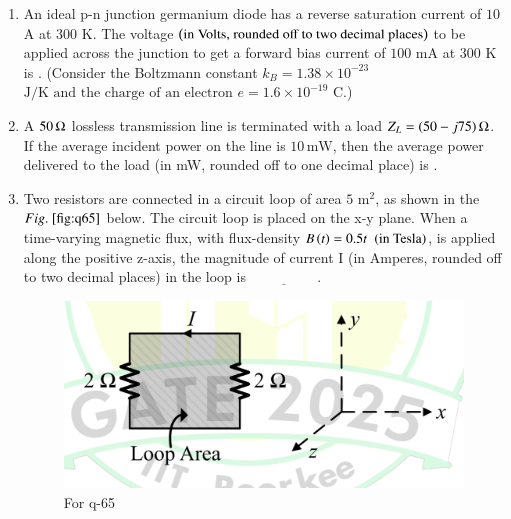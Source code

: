 \documentclass[journal,12pt,onecolumn]{IEEEtran}
\theoremstyle{remark}
\begin{document}
\begin{enumerate}
\hfill{}

\item An ideal p-n junction germanium diode has a reverse saturation current of $10$ \textmu A at $300$ K. The voltage $\left(\text{in Volts, rounded off to two decimal places}\right)$ to be applied across the junction to get a forward bias current of $100$ mA at $300$ K is \underline{\hspace{2cm}}. (Consider the Boltzmann constant $k_B = 1.38 \times 10^{-23}$$ \text{J/K and the charge of an electron } e = 1.6 \times 10^{-19} \text{ C.}$)

\hfill{}

\item A $50 \, \ohm$ lossless transmission line is terminated with a load $Z_L = (50 - j75)\,\ohm$. 
    If the average incident power on the line is $10 \,\text{mW}$, then the average power delivered to the load (in mW, rounded off to one decimal place) is \underline{\hspace{2cm}}.


\hfill{}

\item Two resistors are connected in a circuit loop of area $5$ m$^2$, as shown in the $\figref{fig:q65}$ below. The circuit loop is placed on the x-y plane. When a time-varying magnetic flux, with flux-density $B\left(t\right) = 0.5t$ $\left(\text{in Tesla}\right)$, is applied along the positive z-axis, the magnitude of current I (in Amperes, rounded off to two decimal places) in the loop is $\underline{\hspace{2cm}}$.
\begin{figure}[H]
\centering
\includegraphics[width=0.5\columnwidth]{q65}
\caption{For q-65}
\label{fig:q65}
\end{figure}

\hfill{}

\end{enumerate}
\end{document}
